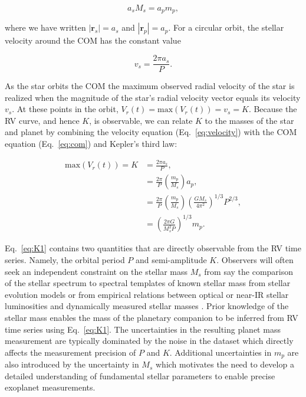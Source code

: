 \begin{equation}
a_s M_s = a_p m_p,
\label{eq:com}
\end{equation}
  
\noindent where we have written $|\mathbf{r}_s|=a_s$ and 
$|\mathbf{r}_p|=a_p$. For a circular orbit, the stellar velocity around the COM has
the constant value

\begin{equation}
v_s = \frac{2\pi a_s}{P}.
\label{eq:velocity}
\end{equation}

\noindent As the star orbits the COM the maximum observed radial velocity of the star
is realized when the magnitude of the star's radial velocity vector
equals its velocity $v_s$. At these points in the orbit, $V_r(t)=\text{max}(V_r(t))=v_s=K$.
Because the RV curve, and hence $K$, is observable, 
we can relate $K$ to the masses of the star and planet by combining the velocity 
equation (Eq.~\ref{eq:velocity}) with the COM equation (Eq.~\ref{eq:com})
and Kepler's third law:

\begin{align}
\mathrm{max}(V_r(t)) = K &= \frac{2\pi a_s}{P}, \\
&= \frac{2\pi}{P} \left( \frac{m_p}{M_s} \right) a_p, \\
&= \frac{2\pi}{P} \left( \frac{m_p}{M_s} \right) \left( \frac{GM_s}{4\pi^2} \right)^{1/3} P^{2/3}, \\
&= \left( \frac{2\pi G}{M_s^2 P} \right)^{1/3} m_p. \label{eq:K1}
\end{align}

Eq.~\ref{eq:K1} contains two quantities that are directly observable from the RV time series.
Namely, the orbital period $P$ and semi-amplitude $K$. Observers will often seek an independent
constraint on the stellar mass $M_s$ from say the comparison of the stellar spectrum to
spectral templates of known stellar mass from stellar evolution models
\citep[e.g.][]{muirhead12} or from
empirical relations between optical or near-IR stellar luminosities and dynamically
measured stellar masses \citep[e.g.][]{benedict16,mann19}. Prior knowledge of the
stellar mass enables the mass of the planetary companion to be inferred from RV time series
using Eq.~\ref{eq:K1}.
The uncertainties in the resulting planet mass 
measurement are typically dominated by the noise in the dataset which directly affects the
measurement precision of $P$ and $K$. Additional uncertainties in $m_p$ are also introduced by
the uncertainty in $M_s$ which motivates the need to develop a detailed understanding of
fundamental stellar parameters to enable precise exoplanet measurements. \\

